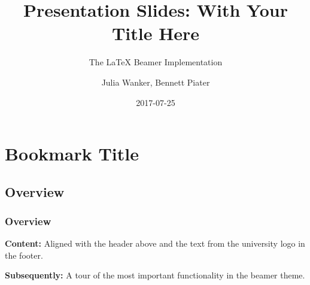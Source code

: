 \documentclass[11pt,t,usepdftitle=false,aspectratio=169]{beamer}
\title[Your Short Title Here]{Presentation Slides: With Your Title Here}
\subtitle{The {\LaTeX} Beamer Implementation}
\author[Julia Wanker \& Bennett Piater]{Julia Wanker, Bennett Piater}
\date{2017-07-25}
\begin{document}



\section{Bookmark Title}

\subsection{Overview}

\begin{frame}
\frametitle{Overview}

  \textbf{Content:} Aligned with the header above and the text from the university logo in the footer.

  \bigskip

  \textbf{Subsequently:} A tour of the most important functionality in the beamer theme.

\end{frame}
\end{document}
